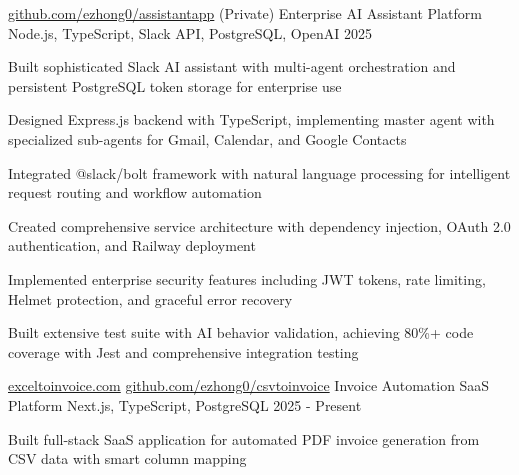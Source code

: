 \documentclass[12pt, letterpaper]{russell}
\begin{document}
\vspace{-0.2cm}
\begin{cventries}
    \cvprojectinline
    {\href{https://github.com/ezhong0/assistantapp}{github.com/ezhong0/assistantapp} (Private)} %
    {Enterprise AI Assistant Platform} %
    {Node.js, TypeScript, Slack API, PostgreSQL, OpenAI} %
    {2025} %
    {
      \begin{cvitems}
        \item {Built sophisticated Slack AI assistant with multi-agent orchestration and persistent PostgreSQL token storage for enterprise use}
        \item {Designed Express.js backend with TypeScript, implementing master agent with specialized sub-agents for Gmail, Calendar, and Google Contacts}
        \item {Integrated @slack/bolt framework with natural language processing for intelligent request routing and workflow automation}
        \item {Created comprehensive service architecture with dependency injection, OAuth 2.0 authentication, and Railway deployment}
        \item {Implemented enterprise security features including JWT tokens, rate limiting, Helmet protection, and graceful error recovery}
        \item {Built extensive test suite with AI behavior validation, achieving 80\%+ code coverage with Jest and comprehensive integration testing}
      \end{cvitems}
    }
    \cvprojectinline
    {\href{exceltoinvoice.com}{exceltoinvoice.com} \textbar{} \href{https://github.com/ezhong0/csvtoinvoice}{github.com/ezhong0/csvtoinvoice}} %
    {Invoice Automation SaaS Platform} %
    {Next.js, TypeScript, PostgreSQL} %
    {2025 - Present} %
    {
      \begin{cvitems}
        \item {Built full-stack SaaS application for automated PDF invoice generation from CSV data with smart column mapping}

\end{cvitems}}
\end{cventries}
\end{document}

